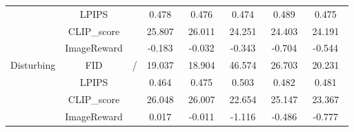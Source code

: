 \begin{table*}
{\begin{tabular}{c|c|c|c|c|c|c|c|c|c|c|c|c|c|c|c}
\cline{2-2}\cline{12-16}
                                                                            & LPIPS           & \multicolumn{9}{c|}{}                                                                                                                                 & 0.478~      & 0.476~       & 0.474~         & 0.489~         & 0.475~         \\ 
\cline{2-2}\cline{12-16}
                                                                            & CLIP\_score     & \multicolumn{9}{c|}{}                                                                                                                                 & 25.807~     & 26.011~      & 24.251~        & 24.403~        & 24.191~        \\ 
\cline{2-2}\cline{12-16}
                                                                            & ImageReward     & \multicolumn{9}{c|}{}                                                                                                                                 & -0.183~     & -0.032~      & -0.343~        & -0.704~        & -0.544~        \\ 
\hline
\multirow{4}{*}{Disturbing}                                                 & FID             & \multicolumn{9}{c|}{\multirow{4}{*}{/}}                                                                                                               & 19.037~     & 18.904~      & 46.574~        & 26.703~        & 20.231~        \\ 
\cline{2-2}\cline{12-16}
                                                                            & LPIPS           & \multicolumn{9}{c|}{}                                                                                                                                 & 0.464~      & 0.475~       & 0.503~         & 0.482~         & 0.481~         \\ 
\cline{2-2}\cline{12-16}
                                                                            & CLIP\_score     & \multicolumn{9}{c|}{}                                                                                                                                 & 26.048~     & 26.007~      & 22.654~        & 25.147~        & 23.367~        \\ 
\cline{2-2}\cline{12-16}
                                                                            & ImageReward     & \multicolumn{9}{c|}{}                                                                                                                                 & 0.017~      & -0.011~      & -1.116~        & -0.486~        & -0.777~        \\ 

\end{tabular}}
\end{table*}
